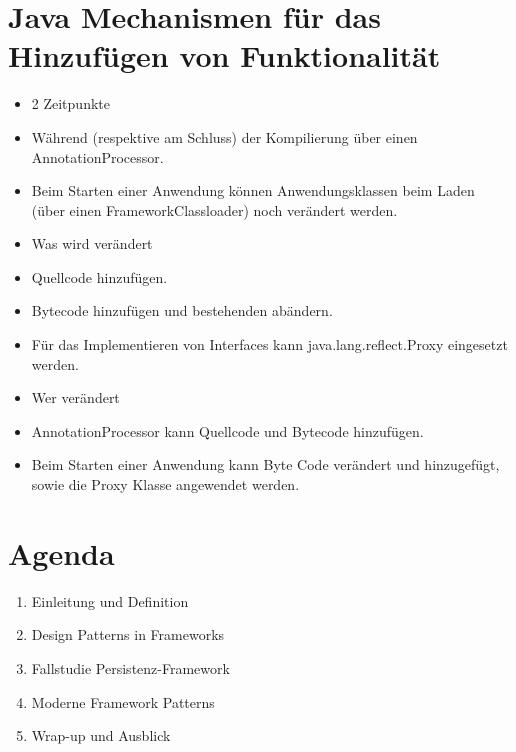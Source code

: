 \section*{Java Mechanismen für das Hinzufügen von Funktionalität}
\begin{itemize}
  \item 2 Zeitpunkte
  \item Während (respektive am Schluss) der Kompilierung über einen AnnotationProcessor.
  \item Beim Starten einer Anwendung können Anwendungsklassen beim Laden (über einen FrameworkClassloader) noch verändert werden.
  \item Was wird verändert
  \item Quellcode hinzufügen.
  \item Bytecode hinzufügen und bestehenden abändern.
  \item Für das Implementieren von Interfaces kann java.lang.reflect.Proxy eingesetzt werden.
  \item Wer verändert
  \item AnnotationProcessor kann Quellcode und Bytecode hinzufügen.
  \item Beim Starten einer Anwendung kann Byte Code verändert und hinzugefügt, sowie die Proxy Klasse angewendet werden.
\end{itemize}

\section*{Agenda}
\begin{enumerate}
  \item Einleitung und Definition
  \item Design Patterns in Frameworks
  \item Fallstudie Persistenz-Framework
  \item Moderne Framework Patterns
  \item Wrap-up und Ausblick
\end{enumerate}

